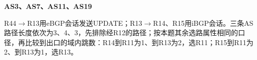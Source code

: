 {\color{ink}\bfseries AS3、AS7、AS11、AS19}\par\vspace{1bp}R44\(\to \)R13用eBGP会话发送UPDATE；R13\(\to \)R14、R15用iBGP会话。三条AS路径长度依次为3、4、3，先排除经R12的路径；按本题其余选路属性相同的口径，再比较到出口的域内跳数：R14到R11为1、到R13为2，选R11；R15到R11为2、到R13为1，选R13。
